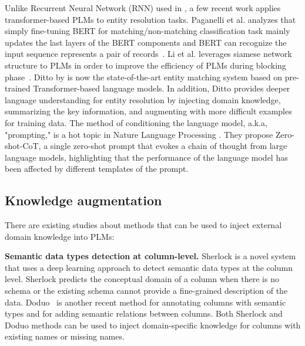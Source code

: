 Unlike Recurrent Neural Network (RNN) used in \cite{zhao_auto-em_2019, mudgal_deep_2018}, a few recent work applies transformer-based PLMs to entity resolution tasks. Paganelli et al. analyzes that simply fine-tuning BERT for matching/non-matching classification task mainly updates the last layers of the BERT components and BERT can recognize the input sequence represents a pair of records~\cite{paganelli_analyzing_2022}. Li et al. leverages siamese network structure to PLMs in order to improve the efficiency of PLMs during blocking phase~\cite{li_improving_2021}. 
Ditto by \cite{li_deep_2020} is now the state-of-the-art entity matching system based on pre-trained Transformer-based language models. In addition, Ditto provides deeper language understanding for entity resolution by injecting domain knowledge, summarizing the key information, and augmenting with more difficult examples for training data. The method of conditioning the language model, a.k.a, "prompting," is a hot topic in Nature Language Processing \cite{kojima_large_2022}. They \cite{kojima_large_2022} propose Zero-shot-CoT, a single zero-shot prompt that evokes a chain of thought from large language models, highlighting that the performance of the language model has been affected by different templates of the prompt. 
\vspace{-0.5em}
\subsection{Knowledge augmentation}
There are existing studies about methods that can be used to inject external domain knowledge into PLMs: 


\textbf{Semantic data types detection at column-level.}
Sherlock \cite{hulsebos_sherlock_2019} is a novel system that uses a deep learning approach to detect semantic data types at the column level. Sherlock predicts the conceptual domain of a column when there is no schema or the existing schema cannot provide a fine-grained description of the data. Doduo~\cite{suhara_annotating_2022} is another recent method for annotating  columns with semantic types and for adding semantic relations between columns. Both Sherlock and Doduo methods can be used to inject domain-specific knowledge for columns with existing names or missing names.


